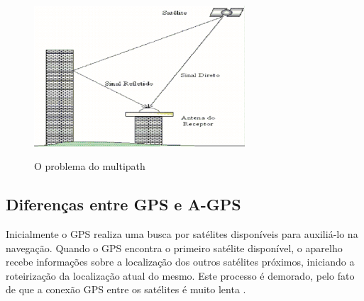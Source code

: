\begin{figure}[H]
    \centering
    \caption{O problema do multipath}
    \includegraphics[width=0.7\textwidth]{./dados/figuras/fig3}
    \label{fig:figura-propagmultipath}
\end{figure}

\subsection{Diferenças entre GPS e A-GPS}


Inicialmente o GPS realiza uma busca por satélites disponíveis para auxiliá-lo na navegação. Quando o GPS encontra o primeiro satélite disponível, o aparelho recebe informações sobre a localização dos outros satélites próximos, iniciando a roteirização da localização atual do mesmo. Este processo é demorado, pelo fato de que a conexão GPS entre os satélites é muito lenta \cite{oficinanetagps:2018}.


